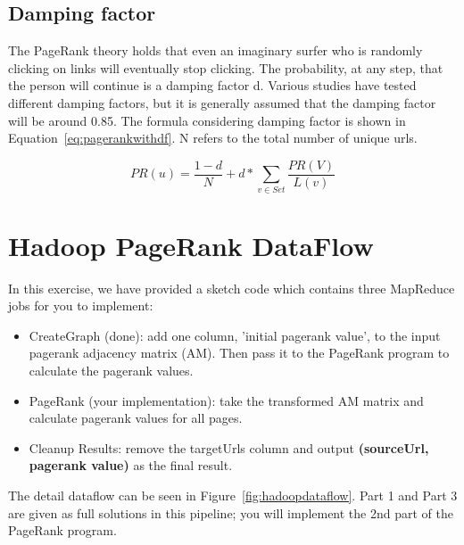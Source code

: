 \subsection*{Damping factor}
The PageRank theory holds that even an imaginary surfer who is randomly
clicking on links will eventually stop clicking. The probability, at any step,
that the person will continue is a damping factor d. Various studies have
tested different damping factors, but it is generally assumed that the damping
factor will be around 0.85. The formula considering damping factor is shown in
Equation~\ref{eq:pagerankwithdf}. N refers to the total number of unique urls. 

\begin{equation}\label{eq:pagerankwithdf}
PR(u) = \frac{1-d}{N} + d * \sum_{v \in Set} \frac{PR(V)}{L(v)}
\end{equation}

\section*{Hadoop PageRank DataFlow}
In this exercise, we have provided a sketch code which contains three MapReduce
jobs for you to implement:

\begin{itemize}
\item CreateGraph (done): add one column, 'initial pagerank value', to the
  input pagerank adjacency matrix (AM). Then pass it to the PageRank program to
    calculate the pagerank values. 
\item PageRank (your implementation): take the transformed AM matrix and
  calculate pagerank values for all pages. 
\item Cleanup Results: remove the targetUrls column and output
  \textbf{(sourceUrl, pagerank value)} as the final result. 
\end{itemize}

The detail dataflow can be seen in Figure~\ref{fig:hadoopdataflow}. Part 1 and
Part 3 are given as full solutions in this pipeline; you will implement the 2nd
part of the PageRank program.

